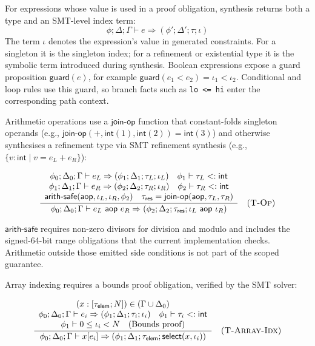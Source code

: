 For expressions whose value is used in a proof obligation, synthesis returns both a type and an SMT-level index term:
\[
  \phi;\Delta;\Gamma \vdash e \Rightarrow (\phi';\Delta';\tau;\iota)
\]
The term $\iota$ denotes the expression's value in generated constraints. For a singleton it is the singleton index; for a refinement or existential type it is the symbolic term introduced during synthesis. Boolean expressions expose a guard proposition $\mathsf{guard}(e)$, for example $\mathsf{guard}(e_1 < e_2) = \iota_1 < \iota_2$. Conditional and loop rules use this guard, so branch facts such as \texttt{lo <= hi} enter the corresponding path context.

Arithmetic operations use a $\textsf{join-op}$ function that constant-folds singleton operands (e.g., $\textsf{join-op}(+, \textsf{int}(1), \textsf{int}(2)) = \textsf{int}(3)$) and otherwise synthesises a refinement type via SMT refinement synthesis (e.g., $\{v\!:\!\textsf{int} \mid v = e_L + e_R\}$):

$$
  \frac{
    \begin{array}{c}
      \phi_0; \Delta_0; \Gamma \vdash e_L \Rightarrow (\phi_1; \Delta_1; \tau_L; \iota_L) \quad \phi_1 \vdash \tau_L <: \textsf{int} \\
      \phi_1; \Delta_1; \Gamma \vdash e_R \Rightarrow (\phi_2; \Delta_2; \tau_R; \iota_R) \quad \phi_2 \vdash \tau_R <: \textsf{int} \\
      \textsf{arith-safe}(\textsf{aop}, \iota_L, \iota_R, \phi_2) \quad
      \tau_\textsf{res} = \textsf{join-op}(\textsf{aop}, \tau_L, \tau_R)
    \end{array}
  }{
    \phi_0; \Delta_0; \Gamma \vdash e_L \textsf{ aop } e_R \Rightarrow (\phi_2; \Delta_2; \tau_\textsf{res}; \iota_L \textsf{ aop } \iota_R)
  } \quad (\textsc{T-Op})
$$

\noindent $\textsf{arith-safe}$ requires non-zero divisors for division and modulo and includes the signed-64-bit range obligations that the current implementation checks. Arithmetic outside those emitted side conditions is not part of the scoped guarantee.

Array indexing requires a bounds proof obligation, verified by the SMT solver:

$$
  \frac{
    \begin{array}{c}
      (x: [\tau_\textsf{elem}; N]) \in (\Gamma \cup \Delta_0)                                                                              \\
      \phi_0; \Delta_0; \Gamma \vdash e_i \Rightarrow (\phi_1; \Delta_1; \tau_i; \iota_i) \quad \phi_1 \vdash \tau_i <: \textsf{int} \\
      \phi_1 \vdash 0 \le \iota_i < N \quad \text{(Bounds proof)}
    \end{array}
  }{
    \phi_0; \Delta_0; \Gamma \vdash x[e_i] \Rightarrow (\phi_1; \Delta_1; \tau_\textsf{elem}; \textsf{select}(x,\iota_i))
  } \quad (\textsc{T-Array-Idx})
$$

